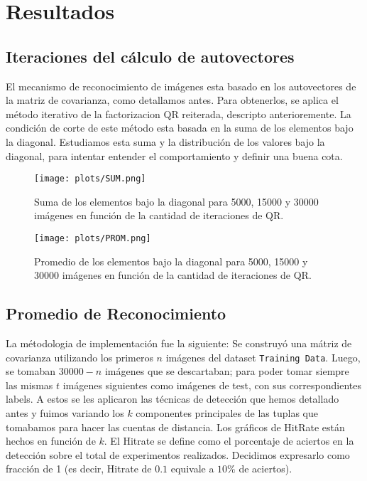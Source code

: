 \section{Resultados}

\subsection{Iteraciones del c\'alculo de autovectores}
El mecanismo de reconocimiento de im\'agenes esta basado en los autovectores
de la matriz de covarianza, como detallamos antes. Para obtenerlos, se aplica
el m\'etodo iterativo de la factorizacion QR reiterada, descripto anterioremente.
La condici\'on de corte de este m\'etodo esta basada en la suma de los elementos bajo
la diagonal. Estudiamos esta suma y la distribuci\'on de los valores bajo la diagonal,
para intentar entender el comportamiento y definir una buena cota. 

\def \hrwidth {500pt}

\begin{figure}[H]
\begin {center}
\texttt{[image: plots/SUM.png]}
\end {center}
\caption{Suma de los elementos bajo la diagonal para 5000, 15000 y 30000 im\'agenes
en funci\'on de la cantidad de iteraciones de QR.}
\label{fig:SUM}
\end{figure}

\begin{figure}[H]
\begin {center}
\texttt{[image: plots/PROM.png]}
\end {center}
\caption{Promedio de los elementos bajo la diagonal para 5000, 15000 y 30000 im\'agenes
en funci\'on de la cantidad de iteraciones de QR.}
\label{fig:PROM}
\end{figure}


\subsection{Promedio de Reconocimiento}
La m\'etodologia de implementaci\'on fue la siguiente: Se construy\'o una
m\'atriz de covarianza utilizando los primeros $n$ im\'agenes del dataset
\texttt{Training Data}. Luego, se tomaban $30000-n$ im\'agenes que se descartaban; para poder tomar 
siempre las mismas $t$ im\'agenes siguientes como im\'agenes de test, con sus 
correspondientes labels. A estos se les aplicaron las t\'ecnicas
de detecci\'on que hemos detallado antes y fuimos variando los $k$ componentes principales 
de las tuplas que tomabamos para hacer las cuentas de distancia.
Los gr\'aficos de HitRate est\'an hechos en funci\'on de $k$.
El Hitrate se define como el porcentaje de aciertos en la detecci\'on sobre el total de 
experimentos realizados. Decidimos expresarlo como fracci\'on de 1 (es decir,
Hitrate de $0.1$ equivale a $10\%$ de aciertos).

